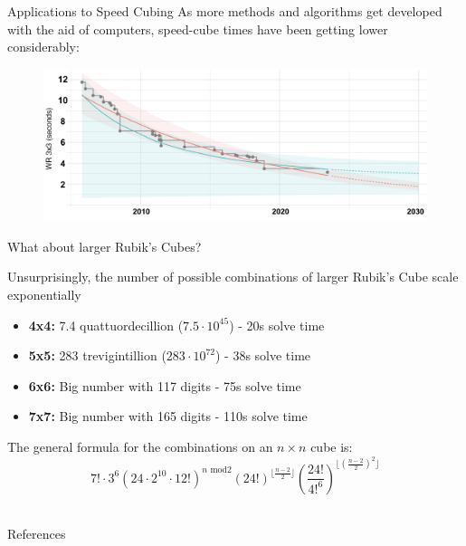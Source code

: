 \documentclass[final]{beamer}
\newlength{\colwidth}
\begin{document}
\begin{frame}[t]
\begin{columns}[t]
\begin{column}{\colwidth}
\begin{block}{Applications to Speed Cubing}
  As more methods and algorithms get developed with the aid of computers,
  speed-cube times have been getting lower considerably:

  \begin{figure}
    \centering
      \includegraphics[width=1.0\textwidth]{logos/solveprogression.png}
  \end{figure}

  \end{block}

  \begin{block}{What about larger Rubik's Cubes?}
    
    \large Unsurprisingly, the number of possible combinations of larger Rubik's Cube scale exponentially \\
    
    \begin{itemize}
      \item \textbf{4x4:} 7.4 quattuordecillion ($7.5\cdot 10^{45}$) - 20s solve time
      \item \textbf{5x5:} 283 trevigintillion ($283 \cdot 10^{72}$) - 38s solve time
      \item \textbf{6x6:} Big number with 117 digits - 75s solve time
      \item \textbf{7x7:} Big number with 165 digits - 110s solve time
    \end{itemize}

    The general formula for the combinations on an $n \times n$ cube is: \\

    $$ \displaystyle 7! \cdot  3^6 \left( 24 \cdot 2^{10} \cdot 12!  \right)^{n \text{ mod} 2}
    (24!)^{\lfloor \frac{n-2}{2} \rfloor} \left( \displaystyle\frac{24!}{4!^{6}} 
    \right)^{\lfloor \left( \frac{n-2}{2} \right)^2 \rfloor} $$ \\


  \end{block}

  \begin{block}{References}


\end{block}
\end{column}
\end{columns}
\end{frame}
\end{document}
